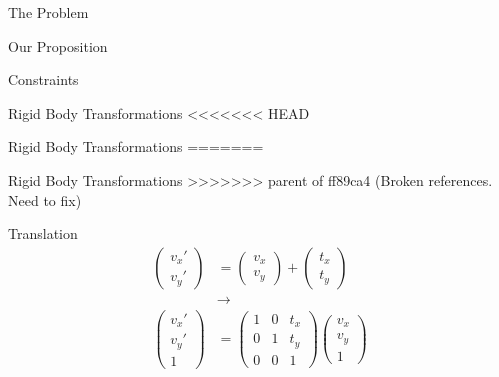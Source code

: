 \documentclass[presentation, aspectratio=1610]{beamer}
\begin{document}
\begin{frame}[label={sec:org51bdd62}]{The Problem}
\begin{frame}[label={sec:org827823c}]{Our Proposition}
\begin{frame}[label={sec:org8655799}]{Constraints}
\begin{frame}[label={sec:orgb624cd0}]{Rigid Body Transformations}
<<<<<<< HEAD
\begin{frame}[label={sec:org66cfa5c}]{Rigid Body Transformations}
=======
\begin{frame}[label={sec:org0f100e3}]{Rigid Body Transformations}
>>>>>>> parent of ff89ca4 (Broken references. Need to fix)
\begin{block}{Translation}
\begin{equation*}
  \begin{aligned}
  \begin{pmatrix}
    v_{x}' \\ v_{y}'
  \end{pmatrix} &=
  \begin{pmatrix}
    v_{x} \\ v_{y}
  \end{pmatrix} +
  \begin{pmatrix}
    t_{x} \\ t_{y}
  \end{pmatrix} \\
                & \rightarrow \\
    \begin{pmatrix}
      v_{x}' \\ v_{y}' \\ 1
    \end{pmatrix} &=
                    \begin{pmatrix}
                      1 & 0 & t_{x} \\ 0 & 1 & t_{y} \\ 0 & 0 & 1
                    \end{pmatrix}
                                                                \begin{pmatrix}
                                                                  v_{x} \\ v_{y} \\  1
                                                                \end{pmatrix}
\end{aligned}
\end{equation*}
\end{block}
\end{frame}


\end{frame}
\end{frame}
\end{frame}
\end{frame}
\end{frame}
\end{document}

